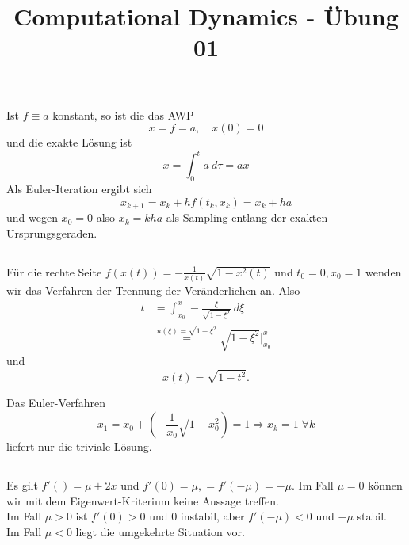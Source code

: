 \documentclass[a4paper]{article}
\title{Computational Dynamics - Übung 01}
\begin{document}
\maketitle

\subsection{}
Ist $f\equiv a$ konstant, so ist die das AWP
\begin{equation}
    \label{eqn:awpA}
    \dot x = f = a, \quad x(0) = 0
\end{equation}
und die exakte Lösung ist
$$
x = \int_0^t a ~dτ = ax
$$
Als Euler-Iteration ergibt sich
\begin{equation}
    \label{eqn:eulerA}
    x_{k+1} = x_k + h f(t_k, x_k) = x_k + ha
\end{equation}
und wegen $x_0=0$ also $x_k = kha$ als Sampling entlang der exakten Ursprungsgeraden.

\subsection{}
Für die rechte Seite $f(x(t)) = - \frac{1}{x(t)} \sqrt{ 1 - x^2(t)}$ und $t_0=0, x_0=1$ wenden wir das Verfahren der Trennung der Veränderlichen an.
Also
\begin{align*}
    t &= \int_{x_0}^x - \frac{ξ}{\sqrt{1-ξ^2}} ~dξ \\
    &\stackrel{u(ξ) = \sqrt{1- ξ^2}} = \sqrt{1-ξ^2} |^x_{x_0}
\end{align*}
und
$$x(t) = \sqrt{1-t^2}.$$

Das Euler-Verfahren
$$x_1 = x_0 + \left( -\frac{1}{x_0}\sqrt{1-x_0^2} \right) = 1\Rightarrow x_k = 1 \; ∀k$$
liefert nur die triviale Lösung.

\subsection{}
Es gilt $f'() = μ + 2x$ und $f'(0) = μ, =f'(-μ) = -μ$.
Im Fall $μ = 0$ können wir mit dem Eigenwert-Kriterium keine Aussage treffen.\\
Im Fall $μ>0$ ist $f'(0)>0$ und $0$ instabil, aber $f'(-μ)<0$ und $-μ$ stabil.\\
Im Fall $μ<0$ liegt die umgekehrte Situation vor.
\end{document}
